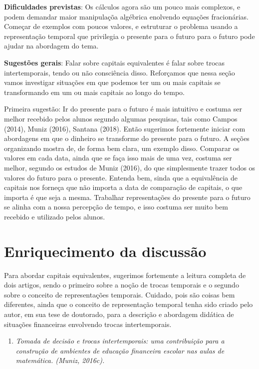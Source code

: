 \begin{paginatexto2}
\textbf{Dificuldades previstas}: Os cálculos agora são um pouco mais complexos, e podem demandar maior manipulaçõa algébrica enolvendo equações fracionárias. Começar de exemplos com poucos valores, e estruturar o problema usando a representação temporal que privilegia o presente para o futuro para o futuro pode ajudar na abordagem do tema.

\textbf{Sugestões gerais}:
Falar sobre capitais equivalentes é falar sobre trocas intertemporais, tendo ou não consciência disso. Reforçamos que nessa seção vamos investigar situações em que podemos ter um ou mais capitais se transformando em um ou mais capitais ao longo do tempo.

Primeira sugestão: Ir do presente para o futuro é mais intuitivo e costuma ser melhor recebido pelos alunos segundo algumas pesquisas, tais como Campos (2014), Muniz (2016), Santana (2018). Então sugerimos fortemente iniciar com abordagens em que o dinheiro se transforme do presente para o futuro. A seções organizando mostra de, de forma bem clara, um exemplo disso. Comparar os valores em cada data, ainda que se faça isso mais de uma vez, costuma ser melhor, segundo os estudos de Muniz (2016), do que simplesmente trazer todos os valores do futuro para o presente. Entenda bem, sinda que a equivalência de capitais nos forneça que não importa a data de comparação de capitais, o que importa é que seja a mesma. Trabalhar representações do presente para o futuro se alinha com a nossa percepção de tempo, e isso costuma ser muito bem recebido e utilizado pelos alunos.

\section{Enriquecimento da discussão}

Para abordar capitais equivalentes, sugerimos fortemente a leitura completa de dois artigos, sendo o primeiro sobre a noção de trocas temporais e o segundo sobre o conceito de representações temporais. Cuidado, pois são coisas bem diferentes, ainda que o conceito de representação temporal tenha sido criado pelo autor, em sua tese de doutorado, para a descrição e abordagem didática de situações financeiras envolvendo trocas intertemporais.

\begin{enumerate}
  \item \textit{Tomada de decisão e trocas intertemporais: uma contribuição para a construção de ambientes de educação financeira escolar nas aulas de matemática. (Muniz, 2016c).}


\end{enumerate}
\end{paginatexto2}
